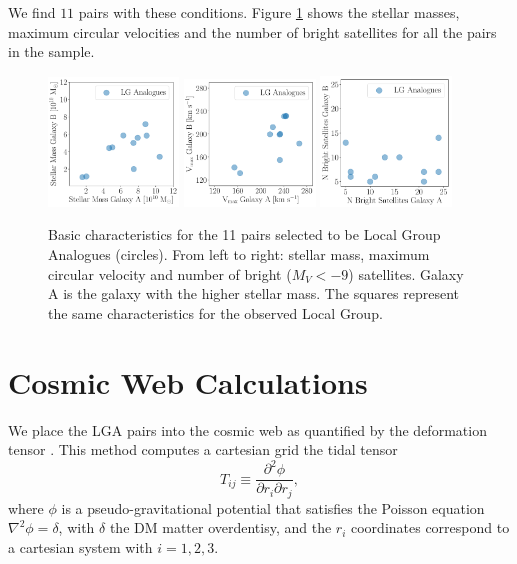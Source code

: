 \documentclass[a4paper,fleqn,usenatbib]{mnras}
\begin{document}
We find $11$ pairs with these conditions.
Figure \ref{fig:general} shows the stellar masses, maximum circular
velocities and the number of bright satellites for all the pairs in
the sample.

\begin{figure}
\centering
\includegraphics[width=0.31\textwidth]{mstar.pdf}
\includegraphics[width=0.31\textwidth]{vmax.pdf}
\includegraphics[width=0.31\textwidth]{nsat.pdf}
\caption{Basic characteristics for the 11 pairs selected to be Local
  Group Analogues (circles). From left to right: stellar mass, maximum circular
  velocity and number of bright ($M_V<-9$) satellites.
  Galaxy A is the galaxy with the higher stellar mass.
  The squares represent the same characteristics for the observed
  Local Group. 
\label{fig:general}}
\end{figure}



\section{Cosmic Web Calculations}
\label{sec:CosmicWeb}

We place the LGA pairs into the cosmic web as quantified by the
deformation tensor  
\citep{2007MNRAS.375..489H,2009MNRAS.396.1815F}.
This method computes a cartesian grid the tidal tensor 
\begin{equation}
T_{ij} \equiv \frac{\partial^2\phi}{\partial r_i \partial r_j},
\end{equation}
%
where $\phi$ is a pseudo-gravitational potential that satisfies the
Poisson equation $\nabla^2\phi=\delta$, with $\delta$ the DM matter
overdentisy, and the $r_i$ coordinates correspond to a cartesian
system with $i=1,2,3$.   
\end{document}
